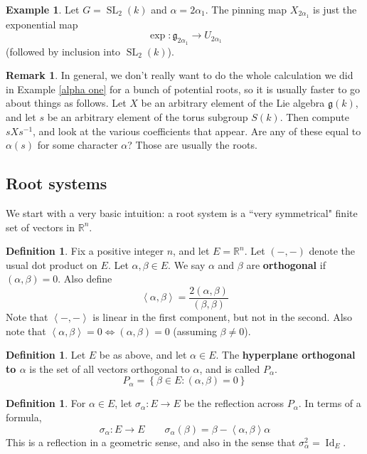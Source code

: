 \documentclass[12pt]{article}
\theoremstyle{definition}
\newtheorem{definition}[theorem]{Definition}
\newtheorem{example}[theorem]{Example}
\newtheorem{remark}[theorem]{Remark}
\numberwithin{theorem}{subsection}
\newcommand{\R}{\mathbb{R}}
\newcommand{\sig}{\sigma}
\newcommand{\lb}{\left\{}
\newcommand{\rb}{\right\}}
\newcommand{\la}{\left\langle}
\newcommand{\ra}{\right\rangle}
\newcommand{\tbf}{\textbf}
\newcommand{\inv}{^{-1}}
\newcommand{\frakg}{\mathfrak{g}}
\DeclareMathOperator{\SL}{SL}
\DeclareMathOperator{\Id}{Id}
\begin{document}
\begin{example}
Let $G = \SL_2(k)$ and $\alpha = 2\alpha_1$. The pinning map $X_{2\alpha_1}$ is just the exponential map
\[
	\exp:\frakg_{2\alpha_1} \to U_{2\alpha_1}
\]
(followed by inclusion into $\SL_2(k)$).
\end{example}

\begin{remark}
In general, we don't really want to do the whole calculation we did in Example \ref{alpha one} for a bunch of potential roots, so it is usually faster to go about things as follows. Let $X$ be an arbitrary element of the Lie algebra $\frakg(k)$, and let $s$ be an arbitrary element of the torus subgroup $S(k)$. Then compute $sXs \inv$, and look at the various coefficients that appear. Are any of these equal to $\alpha(s)$ for some character $\alpha$? Those are usually the roots.
\end{remark}

\subsection{Root systems}
\label{root systems}

We start with a very basic intuition: a root system is a ``very symmetrical" finite set of vectors in $\R^n$.

\begin{definition}
Fix a positive integer $n$, and let $E = \R^n$. Let $(-,-)$ denote the usual dot product on $E$. Let $\alpha, \beta \in E$. We say $\alpha$ and $\beta$ are \tbf{orthogonal} if $(\alpha, \beta) = 0$. Also define
\[
	\la \alpha, \beta \ra = \frac{2(\alpha, \beta)}{(\beta, \beta)}
\]
Note that $\la -, - \ra$ is linear in the first component, but not in the second. Also note that $\la \alpha, \beta \ra = 0 \iff (\alpha, \beta) = 0$ (assuming $\beta \neq 0$).
\end{definition}

\begin{definition}
Let $E$ be as above, and let $\alpha \in E$. The \tbf{hyperplane orthogonal to $\alpha$} is the set of all vectors orthogonal to $\alpha$, and is called $P_\alpha$.
\[
	P_\alpha = \lb \beta \in E : (\alpha, \beta) = 0 \rb
\]
\end{definition}

\begin{definition}
For $\alpha \in E$, let $\sig_\alpha:E \to E$ be the reflection across $P_\alpha$. In terms of a formula,
\[
	\sig_\alpha:E \to E \qquad \sig_\alpha(\beta) = \beta - \la \alpha, \beta \ra \alpha
\]
This is a reflection in a geometric sense, and also in the sense that $\sig_\alpha^2 = \Id_E$.
\end{definition}
\end{document}
